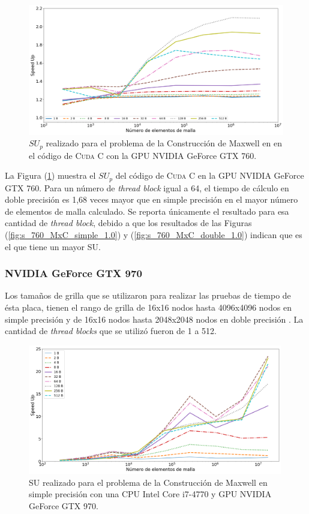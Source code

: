 \begin{figure}[h!]
	\centering
	\includegraphics[width=\textwidth]{figs/cap4/c_760_MxC_cuda_10}
	\caption{$SU_p$ realizado para el problema de la Construcción de Maxwell en en el código de \textsc{Cuda C} con la GPU NVIDIA GeForce GTX 760.} 
	\label{fig:c_760_MxC_cuda_10}	
\end{figure}

La Figura (\ref{fig:c_760_MxC_cuda_10}) muestra el ${SU}_p$ del código de \textsc{Cuda C} en la GPU NVIDIA GeForce GTX 760. Para un número de \textit{thread block} igual a 64, el tiempo de cálculo en doble precisión es 1,68 veces mayor que en simple precisión en el mayor número de elementos de malla calculado. Se reporta únicamente el resultado para esa cantidad de \textit{thread block}, debido a que los resultados de las Figuras (\ref{fig:s_760_MxC_simple_1.0}) y (\ref{fig:s_760_MxC_double_1.0}) indican que es el que tiene un mayor SU.


\subsubsection{NVIDIA GeForce GTX 970}

Los tamaños de grilla que se utilizaron para realizar las pruebas de tiempo de ésta placa, tienen el rango de grilla de 16x16 nodos hasta 4096x4096 nodos en simple precisión y de 16x16 nodos hasta 2048x2048 nodos en doble precisión . La cantidad de \textit{thread blocks} que se utilizó fueron de 1 a 512.



\begin{figure}[htbp]
	\centering
	\includegraphics[width=0.99\textwidth]{figs/cap4/s_970_MxC_simple_10}
	\caption{SU realizado para el problema de la Construcción de Maxwell en simple precisión con una CPU Intel Core i7-4770 y GPU NVIDIA GeForce GTX 970.} 
	\label{fig:s_970_MxC_simple_10}	
\end{figure}

